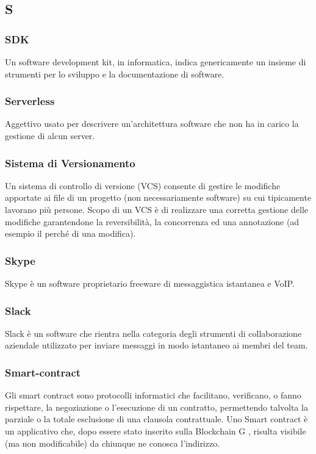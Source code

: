 \subsection*{\textbf{\hfill \Huge{S} \hfill}} 
\subsubsection*{SDK}
Un software development kit, in informatica, indica genericamente un insieme di strumenti per lo sviluppo e la documentazione di software.
\subsubsection*{Serverless}
Aggettivo usato per descrivere un’architettura software che non ha in carico la gestione di alcun server.
\subsubsection*{Sistema di Versionamento}
Un sistema di controllo di versione (VCS) consente di gestire le modifiche apportate ai file di un progetto (non necessariamente software) su cui tipicamente lavorano più persone. Scopo di un VCS è di realizzare una corretta gestione delle modifiche garantendone la reversibilità, la concorrenza ed una annotazione (ad esempio il perché di una modifica).
\subsubsection*{Skype}
Skype è un software proprietario freeware di messaggistica istantanea e VoIP.
\subsubsection*{Slack}
Slack è un software che rientra nella categoria degli strumenti di collaborazione aziendale utilizzato per inviare messaggi in modo istantaneo ai membri del team.
\subsubsection*{Smart-contract}
Gli smart contract sono protocolli informatici che facilitano, verificano, o fanno rispettare, la negoziazione o l’esecuzione di un contratto, permettendo talvolta la parziale o la totale esclusione di una clausola contrattuale. Uno Smart contract è un applicativo che, dopo essere stato inserito sulla Blockchain G , risulta visibile (ma non modificabile) da chiunque ne conosca l’indirizzo.
